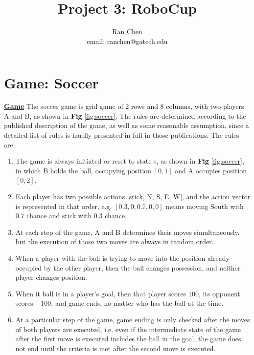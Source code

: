 \documentclass[10pt]{article}
\author{Ran Chen \\ email: ranchen@gatech.edu\vspace{-2ex}}
\title{\vspace{-1.8cm}Project 3: RoboCup}
\date{}
\begin{document}
\maketitle
\thispagestyle{fancy}


\section{Game: Soccer} \label{game}

\ul{\textbf{Game}} The soccer game is grid game of 2 rows and 8 columns, with two players A and B, as shown in \textbf{Fig} \ref{fig:soccer}. The rules are determined according to the published description of the game, as well as some reasonable assumption, since a detailed list of rules is hardly presented in full in those publications. The rules are:\par


\begin{enumerate}
  \item The game is always initiated or reset to state s, as shown in \textbf{Fig} \ref{fig:soccer}, in which B holds the ball, occupying position $[0,1]$ and A occupies position $[0,2]$.
  \item Each player has two possible actions [stick, N, S, E, W], and the action vector is represented in that order, e.g. $[0.3,0,0.7,0,0]$ means moving South with 0.7 chance and stick with 0.3 chance.
  \item At each step of the game, A and B determines their moves simultaneously, but the execution of those two moves are always in random order.
  \item When a player with the ball is trying to move into the position already occupied by the other player, then the ball changes possession, and neither player changes position.
  \item When it ball is in a player's goal, then that player scores $100$, its opponent scores $-100$, and game ends, no matter who has the ball at the time.
  \item At a particular step of the game, game ending is only checked after the moves of both players are executed, i.e. even if the intermediate state of the game after the first move is executed includes the ball in the goal, the game does not end until the criteria is met after the second move is executed.
\end{enumerate}
\end{document}
